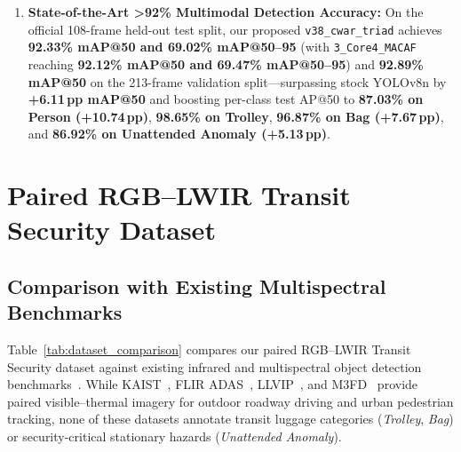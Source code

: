 \documentclass[journal,twoside,web]{ieeecolor}
\begin{document}
\begin{enumerate}
    \item \textbf{State-of-the-Art >92\% Multimodal Detection Accuracy:} On the official 108-frame held-out test split, our proposed \texttt{v38\_cwar\_triad} achieves \textbf{92.33\% mAP@50 and 69.02\% mAP@50--95} (with \texttt{3\_Core4\_MACAF} reaching \textbf{92.12\% mAP@50 and 69.47\% mAP@50--95}) and \textbf{92.89\% mAP@50} on the 213-frame validation split---surpassing stock YOLOv8n by \textbf{+6.11\,pp mAP@50} and boosting per-class test AP@50 to \textbf{87.03\% on Person (+10.74\,pp)}, \textbf{98.65\% on Trolley}, \textbf{96.87\% on Bag (+7.67\,pp)}, and \textbf{86.92\% on Unattended Anomaly (+5.13\,pp)}.
\end{enumerate}

\section{Paired RGB--LWIR Transit Security Dataset}
\label{sec:dataset_and_registration}

\subsection{Comparison with Existing Multispectral Benchmarks}
Table~\ref{tab:dataset_comparison} compares our paired RGB--LWIR Transit Security dataset against existing infrared and multispectral object detection benchmarks~\cite{davis2007background,choi2018kaist,flir_adas_dataset,gonzalez2016pedestrian,jia2021llvip,liu2022target}. While KAIST~\cite{choi2018kaist}, FLIR ADAS~\cite{flir_adas_dataset}, LLVIP~\cite{jia2021llvip}, and M3FD~\cite{liu2022target} provide paired visible--thermal imagery for outdoor roadway driving and urban pedestrian tracking, none of these datasets annotate transit luggage categories (\textit{Trolley}, \textit{Bag}) or security-critical stationary hazards (\textit{Unattended Anomaly}).
\end{document}
